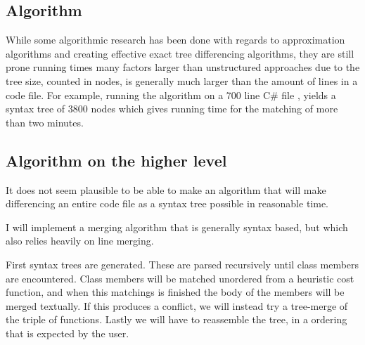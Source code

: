 \documentclass[11pt]{article}
\begin{document}
\subsection{Algorithm}



While some algorithmic research has been done with regards to approximation algorithms and creating effective exact tree differencing algorithms, they are still prone running times many factors larger than unstructured approaches due to the tree size, counted in nodes, is generally much larger than the amount of lines in a code file. For example, running the \citet{Pawlik} algorithm on a 700 line C\# file , yields a syntax tree of 3800 nodes which gives running time for the matching of more than two minutes.




\subsection{Algorithm on the higher level}

It does not seem plausible to be able to make an algorithm that will make differencing an entire code file as a syntax tree possible in reasonable time.

I will implement a merging algorithm that is generally syntax based, but which also relies heavily on line merging.

First syntax trees are generated. These are parsed recursively until class members are encountered. Class members will be matched unordered from a heuristic cost function, and when this matchings is finished the body of the members will be merged textually. If this produces a conflict, we will instead try a tree-merge of the triple of functions.  Lastly we will have to reassemble the tree, in a ordering that is expected by the user. 
\end{document}
